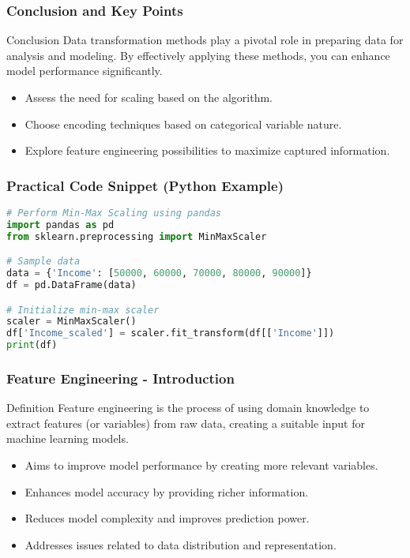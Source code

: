 \documentclass[aspectratio=169]{beamer}
\begin{document}
\begin{frame}
    \frametitle{Conclusion and Key Points}
    \begin{block}{Conclusion}
        Data transformation methods play a pivotal role in preparing data for analysis and modeling.
        By effectively applying these methods, you can enhance model performance significantly.
    \end{block}
    \begin{itemize}
        \item Assess the need for scaling based on the algorithm.
        \item Choose encoding techniques based on categorical variable nature.
        \item Explore feature engineering possibilities to maximize captured information.
    \end{itemize}
\end{frame}

\begin{frame}[fragile]
    \frametitle{Practical Code Snippet (Python Example)}
    \begin{lstlisting}[language=Python]
# Perform Min-Max Scaling using pandas
import pandas as pd
from sklearn.preprocessing import MinMaxScaler

# Sample data
data = {'Income': [50000, 60000, 70000, 80000, 90000]}
df = pd.DataFrame(data)

# Initialize min-max scaler
scaler = MinMaxScaler()
df['Income_scaled'] = scaler.fit_transform(df[['Income']])
print(df)
    \end{lstlisting}
\end{frame}

\begin{frame}[fragile]
    \frametitle{Feature Engineering - Introduction}
    \begin{block}{Definition}
        Feature engineering is the process of using domain knowledge to extract features (or variables) from raw data, creating a suitable input for machine learning models. 
    \end{block}
    \begin{itemize}
        \item Aims to improve model performance by creating more relevant variables.
        \item Enhances model accuracy by providing richer information.
        \item Reduces model complexity and improves prediction power.
        \item Addresses issues related to data distribution and representation.
    \end{itemize}
\end{frame}
\end{document}
